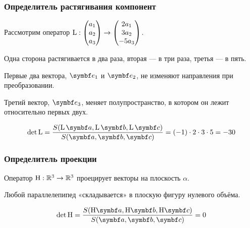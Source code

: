 \begin{frame}
    \frametitle{Определитель растягивания компонент}


    Рассмотрим оператор $\operatorname{L} : \begin{pmatrix}
      a_1 \\
      a_2 \\
      a_3 \\
    \end{pmatrix} \to 
    \begin{pmatrix}
      2a_1 \\
      3a_2 \\
      -5a_3 \\
    \end{pmatrix}$.
    

    \pause

    Одна сторона растягивается в два раза, вторая — в три раза, третья — в пять.


    Первые два вектора, $\be_1$ и $\be_2$, не изменяют направления при преобразовании.

    
    Третий вектор, $\be_3$, меняет полупространство, в котором он лежит относительно первых двух. 

    \pause

    \[
    \det \LL = \frac{S(\LL \ba, \LL \bb, \LL \bc )}{S(\ba, \bb, \bc )} = (-1)\cdot 2\cdot 3\cdot 5  = - 30
    \]

\end{frame}



\begin{frame}
    \frametitle{Определитель проекции}


    Оператор $\mathrm{H} : \mathbb{R}^3 \to \mathbb{R}^3$ проецирует векторы на плоскость $\alpha$. 

    \pause

    Любой параллелепипед «складывается» в плоскую фигуру нулевого объёма.

    \pause

    \[
    \det \HH = \frac{S(\HH \ba, \HH \bb, \HH \bc )}{S(\ba, \bb, \bc )} = 0
    \]

\end{frame}


